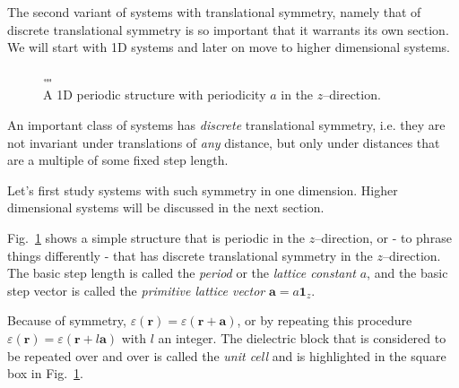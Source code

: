 The second variant of systems with translational symmetry, namely that of discrete translational symmetry is so important that it warrants its own section. We will start with 1D systems and later on move to higher dimensional systems.

\pagebreak


\begin{figure}
\centering
\includegraphics[width=10]{symmetry/figures/periodic}
\caption{A 1D periodic structure with periodicity $a$ in the $z$--direction.}
\label{fig-1d-periodic}
\end{figure}

An important class of systems has \emph{discrete} translational symmetry, i.e. they are not invariant under translations of \emph{any} distance, but only under distances that are a multiple of some fixed step length.

Let's first study systems with such symmetry in one dimension. Higher dimensional systems will be discussed in the next section.

Fig.~\ref{fig-1d-periodic} shows a simple structure that is periodic in the $z$--direction, or - to phrase things differently - that has discrete translational symmetry in the $z$--direction. The basic step length is called the \emph{period} or the \emph{lattice constant} $a$, and the basic step vector is called the \emph{primitive lattice vector} ${\mathbf a} = a {\mathbf 1}_z$.



Because of symmetry, $\varepsilon({\mathbf r}) =  \varepsilon({\mathbf r} + {\mathbf a})$, or by repeating this procedure $\varepsilon({\mathbf r}) =  \varepsilon({\mathbf r} + l {\mathbf a})$ with $l$ an integer. The dielectric block that is considered to be repeated over and over is called the \emph{unit cell} and is highlighted in the square box in Fig.~\ref{fig-1d-periodic}. 



